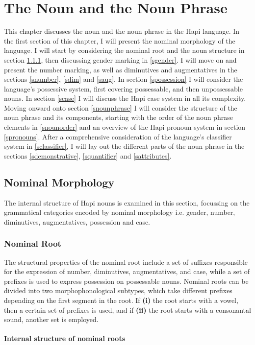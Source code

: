 \documentclass[a4paper, 12pt, oneside]{memoir}
\begin{document}
\chapter{The Noun and the Noun Phrase}
This chapter discusses the noun and the noun phrase in the Hapi language. In the first section of this chapter, I will present the nominal morphology of the language. I will start by considering the nominal root and the noun structure in section \ref{snomroot}, then discussing gender marking in \ref{sgender}. I will move on and present the number marking, as well as diminutives and augmentatives in the sections \ref{snumber}, \ref{sdim} and \ref{saug}. In section \ref{spossession} I will consider the language's possessive system, first covering possessable, and then unpossessable nouns. In section \ref{scase} I will discuss the Hapi case system in all its complexity.
Moving onward onto section \ref{snounphrase} I will consider the structure of the noun phrase and its components, starting with the order of the noun phrase elements in \ref{snounorder} and an overview of the Hapi pronoun system in section \ref{spronouns}. After a comprehensive consideration of the language's classifier system in \ref{sclassifier}, I will lay out the different parts of the noun phrase in the sections \ref{sdemonstrative}, \ref{squantifier} and \ref{sattributes}.

\section{Nominal Morphology}
The internal structure of Hapi nouns is examined in this section, focussing on the grammatical categories encoded by nominal morphology i.e. gender, number, diminutives, augmentatives, possession and case.
\subsection{Nominal Root}\label{snomroot}
The structural properties of the nominal root include a set of suffixes responsible for the expression of number, diminutives, augmentatives, and case, while a set of prefixes is used to express possession on possessable nouns. Nominal roots can be divided into two morphophonological subtypes, which take different prefixes depending on the first segment in the root. If \textbf{(i)} the root starts with a vowel, then a certain set of prefixes is used, and if \textbf{(ii)} the root starts with a consonantal sound, another set is employed. 
\subsubsection{Internal structure of nominal roots}
\end{document}
